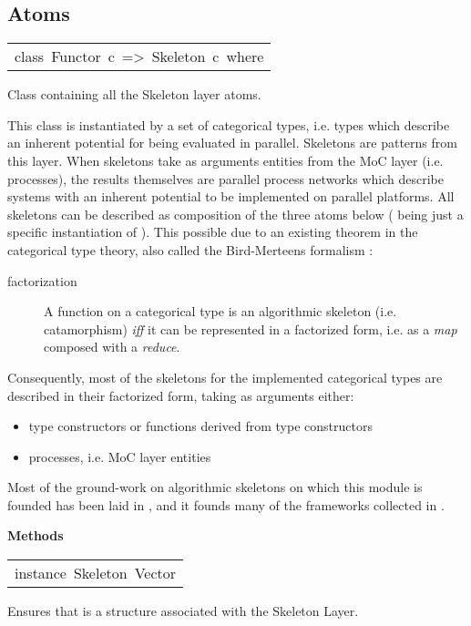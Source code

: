\subsection{Atoms}
\begin{haddockdesc}
\item[\begin{tabular}{@{}l}
class\ Functor\ c\ =>\ Skeleton\ c\ where
\end{tabular}]\haddockbegindoc
Class containing all the Skeleton layer atoms.\par
This class is instantiated by a set of categorical types,
 i.e. types which describe an inherent potential for being evaluated
 in parallel. Skeletons are patterns from this layer. When skeletons
 take as arguments entities from the MoC layer (i.e. processes), the
 results themselves are parallel process networks which describe
 systems with an inherent potential to be implemented on parallel
 platforms. All skeletons can be described as composition of the
 three atoms below (\haddockid{=<<=} being just a specific instantiation of
 ). This possible due to an existing theorem in the categorical
 type theory, also called the Bird-Merteens formalism
 \cite{Bird97}:\par
\par
\begin{description}
\item[factorization] A function on a categorical type is an algorithmic
 skeleton (i.e. catamorphism) \emph{iff} it can be represented in a
 factorized form, i.e. as a \emph{map} composed with a \emph{reduce}.
\end{description}Consequently, most of the skeletons for the implemented categorical
 types are described in their factorized form, taking as arguments
 either:\par
                 \begin{itemize}
                 \item
                 type constructors or functions derived from type constructors\par
                 
                 \item
                 processes, i.e. MoC layer entities\par
                 
                 \end{itemize}
                 Most of the ground-work on algorithmic skeletons on which this
 module is founded has been laid in \cite{Bird97},
 \cite{Skillicorn05} and it founds many
 of the frameworks collected in \cite{Gorlatch03}.\par
                 
\haddockpremethods{}\textbf{Methods}

\item[\begin{tabular}{@{}l}
instance\ Skeleton\ Vector
\end{tabular}]\haddockbegindoc
Ensures that  is a structure associated with the Skeleton Layer.\par

\end{haddockdesc}
